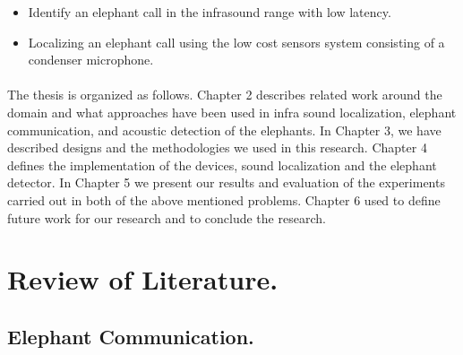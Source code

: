 \documentclass[12pt]{article}
\numberwithin{figure}{section}
\numberwithin{table}{section}
\begin{document}
\begin{flushleft}
\end{flushleft}

\begin{itemize}

\item 	Identify an elephant call in the infrasound range with low latency.
\item 	Localizing an elephant call using the low cost sensors system consisting of a condenser microphone.
\end{itemize}

\paragraph{}
The thesis is organized as follows. Chapter 2 describes related work around the domain and what approaches have been used in infra sound localization, elephant communication, and acoustic detection of the elephants.  In Chapter 3, we have described designs and the methodologies we used in this research. Chapter 4 defines the implementation of the devices, sound localization and the elephant detector. In Chapter 5 we present our results and evaluation of the experiments carried out in both of the above mentioned problems. Chapter 6 used to define future work for our research and to conclude the research.



\newpage
\section{Review of Literature.}
\subsection{Elephant Communication.}
\end{document}

